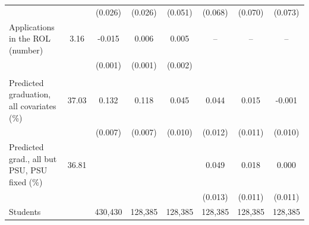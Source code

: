 \begin{tabular}{lc*{6}{c}}
 &  & (0.026) & (0.026) & (0.051) & (0.068) & (0.070) & (0.073) \\
Applications in the ROL (number) &   3.16 & -0.015\sym{***} &  0.006\sym{***} &  0.005\sym{**} & -- & -- & -- \\
 &  & (0.001) & (0.001) & (0.002) &  &  &  \\
\addlinespace
\multicolumn{8}{l}{\textit{Joint tests}} \\
Predicted graduation, all covariates (\%) &  37.03 &  0.132\sym{***} &  0.118\sym{***} &  0.045\sym{***} &  0.044\sym{***} &  0.015 & -0.001 \\
 &  & (0.007) & (0.007) & (0.010) & (0.012) & (0.011) & (0.010) \\
Predicted grad., all but PSU, PSU fixed (\%) &  36.81 &  &  &  &  0.049\sym{***} &  0.018 &  0.000 \\
 &  &  &  &  & (0.013) & (0.011) & (0.011) \\
\midrule
Students & &   430,430 &   128,385 &   128,385 &   128,385 &   128,385 &   128,385 \\
\bottomrule
\end{tabular}
